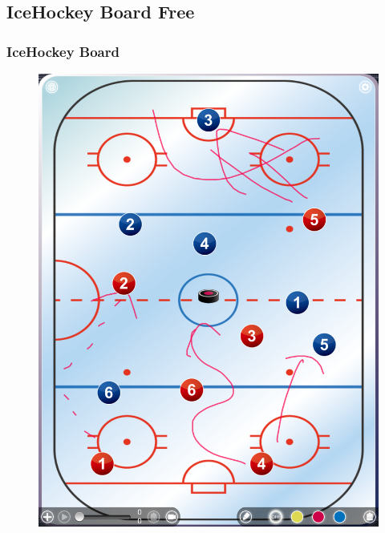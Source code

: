 \documentclass{beamer}
\begin{document}
\subsection{IceHockey Board Free}
\begin{frame}
\frametitle{IceHockey Board}

  \begin{figure}[H]
    \includegraphics[height=.8\textheight]{img/IMG_0018}
    \label{pic:icehockeyboardfree}
  \end{figure}

\end{frame}
\end{document}
